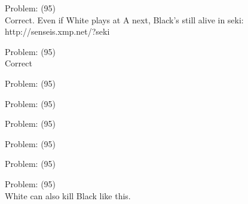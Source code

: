 \documentclass[11pt]{article}
\begin{document}
\begin{minipage}[t]{0.5\textwidth}
  {\centering
  
Problem: (95)\\
Correct. Even if White plays at A next, Black's still alive in seki: http://senseis.xmp.net/?seki\\
  }
\end{minipage}
\begin{minipage}[t]{0.5\textwidth}
  {\centering
  
Problem: (95)\\
Correct\\
  }
\end{minipage}
\begin{minipage}[t]{0.5\textwidth}
  {\centering
  
Problem: (95)\\
  }
\end{minipage}
\begin{minipage}[t]{0.5\textwidth}
  {\centering
  
Problem: (95)\\
  }
\end{minipage}
\begin{minipage}[t]{0.5\textwidth}
  {\centering
  
Problem: (95)\\
  }
\end{minipage}
\begin{minipage}[t]{0.5\textwidth}
  {\centering
  
Problem: (95)\\
  }
\end{minipage}
\begin{minipage}[t]{0.5\textwidth}
  {\centering
  
Problem: (95)\\
  }
\end{minipage}
\begin{minipage}[t]{0.5\textwidth}
  {\centering
  
Problem: (95)\\
White can also kill Black like this.\\
  }
\end{minipage}
\end{document}
